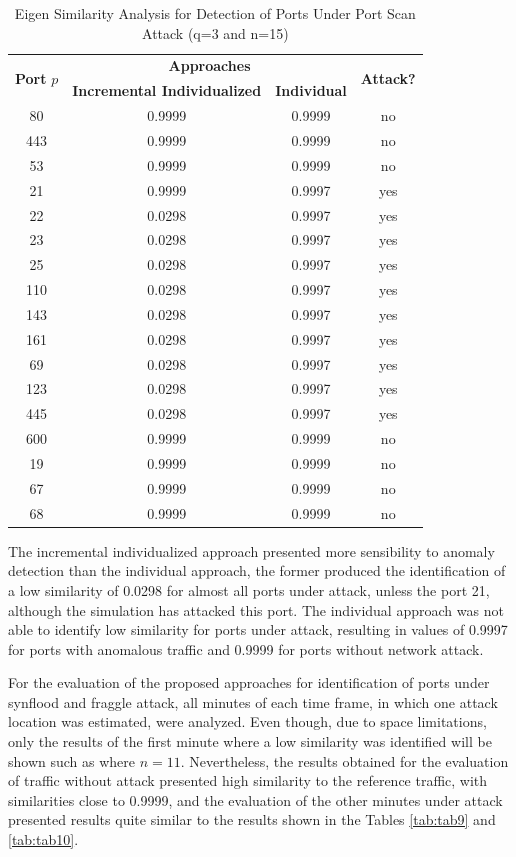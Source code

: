 \begin{table}[h!]
  \centering
  \caption{Eigen Similarity Analysis for Detection of Ports Under Port Scan Attack (q=3 and n=15)}
  \label{tab:tab8}
  \begin{tabular}{ c c c c }
	\toprule
	\multirow{2}{*}{\textbf{Port} $p$}   &\multicolumn{2}{c}{\textbf{Approaches}} &\multirow{2}{*}{\textbf{Attack?}}\\ 
			\hhline{~--~}
			&\textbf{Incremental Individualized} &\textbf{Individual}\\
	\midrule
	80 &0.9999 &0.9999 &no \\
	443 &0.9999 &0.9999 &no \\
	53 &0.9999 &0.9999 &no \\
	21 &0.9999 &0.9997 &yes \\
	22 &0.0298 &0.9997 &yes \\
	23 &0.0298 &0.9997 &yes \\
	25 &0.0298 &0.9997 &yes \\
	110 &0.0298 &0.9997 &yes \\
	143 &0.0298 &0.9997 &yes \\
	161 &0.0298 &0.9997 &yes \\
	69 &0.0298 &0.9997 &yes \\
	123 &0.0298 &0.9997 &yes \\
	445 &0.0298 &0.9997 &yes \\
	600 &0.9999 &0.9999 &no \\
	19 &0.9999 &0.9999 &no \\
	67 &0.9999 &0.9999 &no \\
	68 &0.9999 &0.9999 &no \\
    \bottomrule
  \end{tabular}
\end{table}

The incremental individualized approach presented more sensibility to anomaly detection than the individual approach, the former produced the identification of a low similarity of 0.0298 for almost all ports under attack, unless the port 21, although the simulation has attacked this port. The individual approach was not able to identify low similarity for ports under attack, resulting in values of 0.9997 for ports with anomalous traffic and 0.9999 for ports without network attack.

For the evaluation of the proposed approaches for identification of ports under synflood and fraggle attack, all minutes of each time frame, in which one attack location was estimated, were analyzed. Even though, due to space limitations, only the results of the first minute where a low similarity was identified will be shown such as where $n=11$. Nevertheless, the results obtained for the evaluation of traffic without attack presented high similarity to the reference traffic, with similarities close to 0.9999, and the evaluation of the other minutes under attack presented results quite similar to the results shown in the Tables \ref{tab:tab9} and \ref{tab:tab10}.

